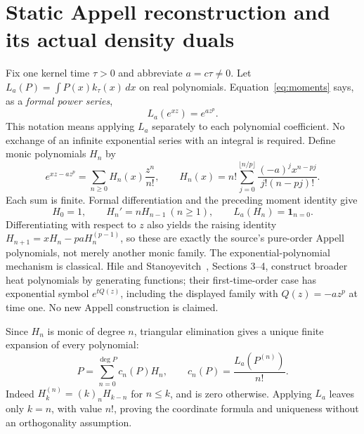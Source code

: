 \documentclass[11pt]{article}
\theoremstyle{remark}\newtheorem{remark}[theorem]{Remark}
\begin{document}
\section{Static Appell reconstruction and its actual density duals}
Fix one kernel time $\tau>0$ and abbreviate $a=c\tau\ne0$.
Let $L_a(P)=\int P(x)k_\tau(x)\,dx$ on real polynomials.
Equation~\eqref{eq:moments} says, as a \emph{formal power series},
\[
 L_a(e^{xz})=e^{az^p}.
\]
This notation means applying $L_a$ separately to each polynomial
coefficient. No exchange of an infinite exponential series with an
integral is required. Define monic polynomials $H_n$ by
\begin{equation}\label{eq:appellgenerating}
 e^{xz-az^p}=\sum_{n\geq0}H_n(x)\frac{z^n}{n!},\qquad
 H_n(x)=n!\sum_{j=0}^{\lfloor n/p\rfloor}
       \frac{(-a)^j x^{n-pj}}{j!(n-pj)!}.
\end{equation}
Each sum is finite. Formal differentiation and the preceding moment
identity give
\[
 H_0=1,\qquad H_n'=nH_{n-1}\ (n\geq1),\qquad
 L_a(H_n)=\mathbf1_{n=0}.
\]
Differentiating with respect to $z$ also yields the raising identity
$H_{n+1}=xH_n-paH_n^{(p-1)}$, so these are exactly the source's
pure-order Appell polynomials, not merely another monic family.
The exponential-polynomial mechanism is classical. Hile and
Stanoyevitch~\cite{hile}, Sections 3--4, construct broader heat
polynomials by generating functions; their first-time-order case
has exponential symbol $e^{tQ(z)}$, including the displayed family
with $Q(z)=-az^p$ at time one. No new Appell construction is claimed.

Since $H_n$ is monic of degree $n$, triangular elimination gives a
unique finite expansion of every polynomial:
\begin{equation}\label{eq:appellcoordinates}
 P=\sum_{n=0}^{\deg P}c_n(P)H_n,\qquad
 c_n(P)=\frac{L_a(P^{(n)})}{n!}.
\end{equation}
Indeed $H_k^{(n)}=(k)_nH_{k-n}$ for $n\leq k$, and is zero otherwise.
Applying $L_a$ leaves only $k=n$, with value $n!$, proving the
coordinate formula and uniqueness without an orthogonality assumption.
\end{document}
